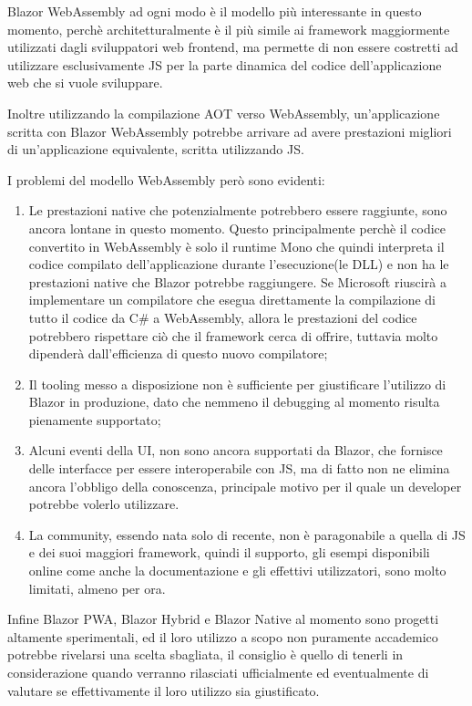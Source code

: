Blazor WebAssembly ad ogni modo \`e il modello pi\`u interessante in questo momento, perch\`e architetturalmente \`e il pi\`u simile ai framework maggiormente utilizzati dagli sviluppatori web frontend, ma permette di non essere costretti ad utilizzare esclusivamente JS per la parte dinamica del codice dell'applicazione web che si vuole sviluppare.

Inoltre utilizzando la compilazione AOT verso WebAssembly, un'applicazione scritta con Blazor WebAssembly potrebbe arrivare ad avere prestazioni  migliori di un'applicazione equivalente, scritta utilizzando JS.

I problemi del modello WebAssembly per\`o sono evidenti:
\begin{enumerate}
	\item Le prestazioni native che potenzialmente potrebbero essere raggiunte, sono ancora lontane in questo momento.
	Questo principalmente perch\`e il codice convertito in WebAssembly \`e solo il runtime Mono che quindi interpreta il codice compilato dell'applicazione durante l'esecuzione(le DLL) e non ha le prestazioni native che Blazor potrebbe raggiungere.
	Se Microsoft riuscir\`a a implementare un compilatore che esegua direttamente la compilazione di tutto il codice da C\# a WebAssembly, allora le prestazioni del codice potrebbero rispettare ci\`o che il framework cerca di offrire, tuttavia molto dipender\`a dall'efficienza di questo nuovo compilatore;
	\item Il tooling messo a disposizione non \`e sufficiente per giustificare l'utilizzo di Blazor in produzione, dato che nemmeno il debugging al momento risulta pienamente supportato;
	\item Alcuni eventi della UI, non sono ancora supportati da Blazor, che fornisce delle interfacce per essere interoperabile con JS, ma di fatto non ne elimina ancora l'obbligo della conoscenza, principale motivo per il quale un developer potrebbe volerlo utilizzare.
	\item La community, essendo nata solo di recente, non \`e paragonabile a quella di JS e dei suoi maggiori framework, quindi il supporto, gli esempi disponibili online come anche la documentazione e gli effettivi utilizzatori, sono molto limitati, almeno per ora.
\end{enumerate}

Infine Blazor PWA, Blazor Hybrid e Blazor Native al momento sono progetti altamente sperimentali, ed il loro utilizzo a scopo non puramente accademico potrebbe rivelarsi una scelta sbagliata, il consiglio \`e quello di tenerli in considerazione quando verranno rilasciati ufficialmente ed eventualmente di valutare se effettivamente il loro utilizzo sia giustificato.

